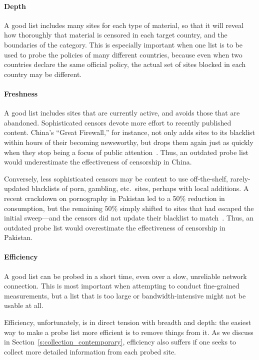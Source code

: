 \paragraph{Depth} A good list includes many sites for each type of
material, so that it will reveal how thoroughly that material is
censored in each target country, and the boundaries of the category.
This is especially important when one list is to be used to probe the
policies of many different countries, because even when two countries
declare the same official policy, the actual set of sites blocked in
each country may be different.

\paragraph{Freshness} A good list includes sites that are currently
active, and avoids those that are abandoned.  Sophisticated censors
devote more effort to recently published content.  China's “Great
Firewall,” for instance, not only adds sites to its blacklist within
hours of their becoming newsworthy, but drops them again just as
quickly when they stop being a focus of public
attention~\cite{zhu2013cn.velocity, aase2012whiskey,
  crandall2007.conceptdoppler}. Thus, an outdated probe list would
underestimate the effectiveness of censorship in China.

Conversely, less sophisticated censors may be content to use
off-the-shelf, rarely-updated blacklists of porn, gambling,
etc.\ sites, perhaps with local additions.  A recent crackdown on
pornography in Pakistan led to a 50\% reduction in consumption, but
the remaining 50\% simply shifted to sites that had escaped the
initial sweep---and the censors did not update their blacklist to
match~\cite{nabi2013pk.anatomy}. Thus, an outdated probe list would
overestimate the effectiveness of censorship in Pakistan.

\paragraph{Efficiency} A good list can be probed in a
short time, even over a slow, unreliable network connection.  This is
most important when attempting to conduct fine-grained measurements,
but a list that is too large or bandwidth-intensive might not be
usable at all.

Efficiency, unfortunately, is in direct tension with breadth and
depth: the easiest way to make a probe list more efficient is to
remove things from it. As we discuss in
Section~\ref{s:collection_contemporary}, efficiency also suffers if
one seeks to collect more detailed information from each probed site.

